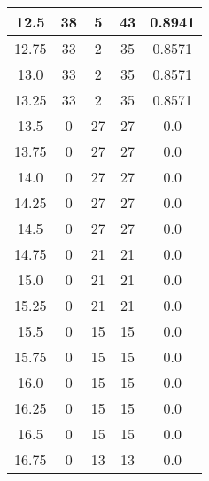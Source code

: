 \documentclass[letterpaper, 12pt]{article}
\begin{document}
\begin{longtable}{|c|c|c|c|c|}
12.5 & 38 & 5 & 43 & 0.8941 \\
\hline
12.75 & 33 & 2 & 35 & 0.8571 \\
\hline
13.0 & 33 & 2 & 35 & 0.8571 \\
\hline
13.25 & 33 & 2 & 35 & 0.8571 \\
\hline
13.5 & 0 & 27 & 27 & 0.0 \\
\hline
13.75 & 0 & 27 & 27 & 0.0 \\
\hline
14.0 & 0 & 27 & 27 & 0.0 \\
\hline
14.25 & 0 & 27 & 27 & 0.0 \\
\hline
14.5 & 0 & 27 & 27 & 0.0 \\
\hline
14.75 & 0 & 21 & 21 & 0.0 \\
\hline
15.0 & 0 & 21 & 21 & 0.0 \\
\hline
15.25 & 0 & 21 & 21 & 0.0 \\
\hline
15.5 & 0 & 15 & 15 & 0.0 \\
\hline
15.75 & 0 & 15 & 15 & 0.0 \\
\hline
16.0 & 0 & 15 & 15 & 0.0 \\
\hline
16.25 & 0 & 15 & 15 & 0.0 \\
\hline
16.5 & 0 & 15 & 15 & 0.0 \\
\hline
16.75 & 0 & 13 & 13 & 0.0 \\
\hline
\end{longtable}
\end{document}
